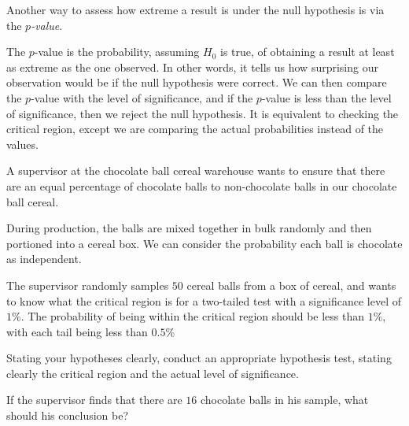 Another way to assess how extreme a result is under the null hypothesis is via the \emph{$p$-value}.

The $p$-value is the probability, assuming $H_0$ is true, of obtaining a result at least as extreme as the one observed. In other words, it tells us how surprising our observation would be if the null hypothesis were correct. We can then compare the $p$-value with the level of significance, and if the $p$-value is less than the level of significance, then we reject the null hypothesis. It is equivalent to checking the critical region, except we are comparing the actual probabilities instead of the values.

\begin{example}
    A supervisor at the chocolate ball cereal warehouse wants to ensure that there are an equal percentage of chocolate balls to non-chocolate balls in our chocolate ball cereal.

    During production, the balls are mixed together in bulk randomly and then portioned into a cereal box. We can consider the probability each ball is chocolate as independent.
    
    The supervisor randomly samples $50$ cereal balls from a box of cereal, and wants to know what the critical region is for a two-tailed test with a significance level of $1\%$. The probability of being within the critical region should be less than $1\%$, with each tail being less than $0.5\%$

    Stating your hypotheses clearly, conduct an appropriate hypothesis test, stating clearly the critical region and the actual level of significance.

    If the supervisor finds that there are $16$ chocolate balls in his sample, what should his conclusion be?
\end{example}

